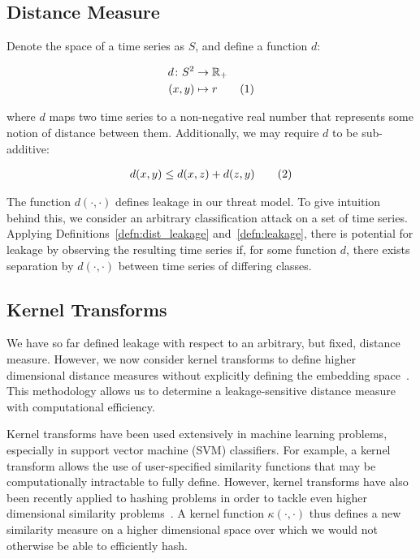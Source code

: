 \documentclass[a4paper]{article}
\newcommand\numberthis{\addtocounter{equation}{1}\tag{\theequation}}
\theoremstyle{def}
\theoremstyle{thm}
\newcommand{\R}[0]{\mathbb{R}}
\begin{document}
\subsection{Distance Measure}
Denote the space of a time series as $S$, and define a function $d$:

\begin{align*}
    d \colon S^2 &\to \R_{+}\\
    (x,y) &\mapsto r \numberthis
\end{align*}

where $d$ maps two time series to a non-negative real number that represents some notion of distance between them.
Additionally, we may require $d$ to be sub-additive:

\begin{align*}
    d(x,y) \le d(x,z) + d(z,y) \numberthis
\end{align*}

The function $d(\cdot,\cdot)$ defines leakage in our threat model.
To give intuition behind this, we consider an arbitrary classification attack on a set of time series.
Applying Definitions~\ref{defn:dist_leakage} and~\ref{defn:leakage}, there is potential for leakage by observing the resulting time series if, for some function $d$, there exists separation by $d(\cdot, \cdot)$ between time series of differing classes.




\subsection{Kernel Transforms}
\label{subsec:kernel_transforms}

We have so far defined leakage with respect to an arbitrary, but fixed, distance measure.
However, we now consider kernel transforms to define higher dimensional distance measures without explicitly defining the embedding space~\cite{Scholkopf00}.
This methodology allows us to determine a leakage-sensitive distance measure with computational efficiency.

Kernel transforms have been used extensively in machine learning problems, especially in support vector machine (SVM) classifiers. 
For example, a kernel transform allows the use of user-specified similarity functions that may be computationally intractable to fully define.
However, kernel transforms have also been recently applied to hashing problems in order to tackle even higher dimensional similarity problems~\cite{Kulis12-KLSH, Kale14-KLSH, Jiang15-KLSH}.
A kernel function $\kappa(\cdot,\cdot)$ thus defines a new similarity measure on a higher dimensional space over which we would not otherwise be able to efficiently hash.
\end{document}
